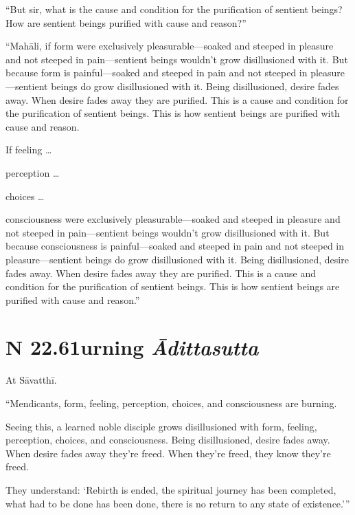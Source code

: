 \documentclass[12pt,openany]{book}%
\newcommand*{\suttatitleacronym}[1]{\smaller[2]{#1}\vspace*{.3em}}
\newcommand*{\suttatitletranslation}[1]{\linebreak{#1}}
\newcommand*{\suttatitleroot}[1]{\linebreak\smaller[2]\itshape{#1}}
\newcommand*{\tocacronym}[1]{\hspace*{-3.3em}{#1}\quad}
\newcommand*{\toctranslation}[1]{#1}
\newcommand*{\tocroot}[1]{(\textit{#1})}
\begin{document}
“But sir, what is the cause and condition for the purification of sentient beings? How are sentient beings purified with cause and reason?” 

“\textsanskrit{Mahāli}, if form were exclusively pleasurable—soaked and steeped in pleasure and not steeped in pain—sentient beings wouldn’t grow disillusioned with it. But because form is painful—soaked and steeped in pain and not steeped in pleasure—sentient beings do grow disillusioned with it. Being disillusioned, desire fades away. When desire fades away they are purified. This is a cause and condition for the purification of sentient beings. This is how sentient beings are purified with cause and reason. 

If feeling … 

perception … 

choices … 

consciousness were exclusively pleasurable—soaked and steeped in pleasure and not steeped in pain—sentient beings wouldn’t grow disillusioned with it. But because consciousness is painful—soaked and steeped in pain and not steeped in pleasure—sentient beings do grow disillusioned with it. Being disillusioned, desire fades away. When desire fades away they are purified. This is a cause and condition for the purification of sentient beings. This is how sentient beings are purified with cause and reason.” 

%
\section*{{\suttatitleacronym SN 22.61}{\suttatitletranslation Burning }{\suttatitleroot Ādittasutta}}
\addcontentsline{toc}{section}{\tocacronym{SN 22.61} \toctranslation{Burning } \tocroot{Ādittasutta}}

At \textsanskrit{Sāvatthī}. 

“Mendicants, form, feeling, perception, choices, and consciousness are burning. 

Seeing this, a learned noble disciple grows disillusioned with form, feeling, perception, choices, and consciousness. Being disillusioned, desire fades away. When desire fades away they’re freed. When they’re freed, they know they’re freed. 

They understand: ‘Rebirth is ended, the spiritual journey has been completed, what had to be done has been done, there is no return to any state of existence.’” 
\end{document}
